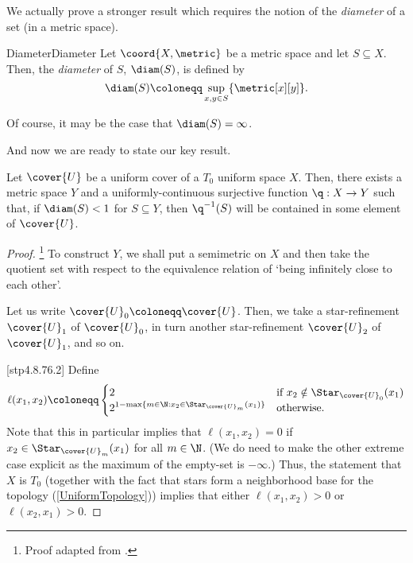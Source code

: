 We actually prove a stronger result which requires the notion of the \emph{diameter} of a set (in a metric space).
\begin{dfn}{Diameter}{Diameter}
Let $\coord{X,\metric}$ be a metric space and let $S\subseteq X$.  Then, the \emph{diameter} of $S$, $\diam (S)$, is defined by
\begin{equation}
\diam (S)\coloneqq \sup _{x,y\in S}\{ \metric[x][y]\} .
\end{equation}
\begin{rmk}
Of course, it may be the case that $\diam (S)=\infty$.
\end{rmk}
\end{dfn}
And now we are ready to state our key result.
\begin{thm}{}{}
Let $\cover{U}$ be a uniform cover of a $T_0$ uniform space $X$.  Then, there exists a metric space $Y$ and a uniformly-continuous surjective function $\q :X\rightarrow Y$ such that, if $\diam (S)<1$ for $S\subseteq Y$, then $\q ^{-1}(S)$ will be contained in some element of $\cover{U}$.
\begin{proof}\footnote{Proof adapted from \cite[pg.~8]{Isbell}.}
To construct $Y$, we shall put a semimetric on $X$ and then take the quotient set with respect to the equivalence relation of `being infinitely close to each other'.

\blankline
{}
Let us write $\cover{U}_0\coloneqq \cover{U}$.  Then, we take a star-refinement $\cover{U}_1$ of $\cover{U}_0$, in turn another star-refinement $\cover{U}_2$ of $\cover{U}_1$, and so on.

[stp4.8.76.2]
Define
\begin{equation}\label{eqn4.3.21}
\ell (x_1,x_2)\coloneqq \begin{cases}2 & \text{if }x_2\notin \Star _{\cover{U}_0}(x_1) \\ 2^{1-\max \{ m\in \N :x_2\in \Star _{\cover{U}_m}(x_1)\}} & \text{otherwise.}\end{cases}
\end{equation}
Note that this in particular implies that $\ell (x_1,x_2)=0$ if $x_2\in \Star _{\cover{U}_m}(x_1)$ for all $m\in \N$.  (We do need to make the other extreme case explicit as the maximum of the empty-set is $-\infty$.)  Thus, the statement that $X$ is $T_0$ (together with the fact that stars form a neighborhood base for the topology (\cref{UniformTopology})) implies that either $\ell (x_1,x_2)>0$ or $\ell (x_2,x_1)>0$.


\end{proof}
\end{thm}
